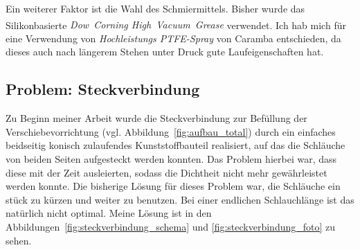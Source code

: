 \documentclass[
    11pt,
    ngerman
]{scrbook}
\begin{document}
Ein weiterer Faktor ist die Wahl des Schmiermittels. Bisher wurde das
Silikonbasierte \linebreak \emph{Dow~Corning\textsuperscript{\textregistered}
High~Vacuum~Grease} verwendet. Ich hab mich für eine Verwendung von \linebreak
\emph{Hochleistungs PTFE-Spray} von Caramba entschieden, da dieses
auch nach längerem Stehen unter Druck gute Laufeigenschaften hat.


\subsection{Problem: Steckverbindung}

Zu Beginn meiner Arbeit wurde die Steckverbindung zur Befüllung der
Verschiebevorrichtung (vgl. Abbildung~\ref{fig:aufbau_total}) durch ein
einfaches beidseitig konisch zulaufendes Kunststoffbauteil realisiert, auf das
die Schläuche von beiden Seiten aufgesteckt werden konnten. Das Problem
hierbei war, dass diese mit der Zeit ausleierten, sodass die Dichtheit nicht
mehr gewährleistet werden konnte. Die bisherige Lösung für dieses Problem war,
die Schläuche ein stück zu kürzen und weiter zu benutzen. Bei einer endlichen
Schlauchlänge ist das natürlich nicht optimal. Meine Lösung ist in den
Abbildungen~\ref{fig:steckverbindung_schema} und
\ref{fig:steckverbindung_foto} zu sehen.
\end{document}
